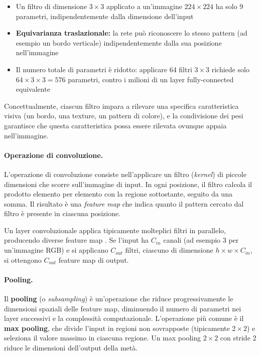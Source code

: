 \begin{itemize}
\item Un filtro di dimensione $3 \times 3$ applicato a un'immagine $224 \times 224$ ha solo 9 parametri, indipendentemente dalla dimensione dell'input
\item \textbf{Equivarianza traslazionale:} la rete può riconoscere lo stesso pattern (ad esempio un bordo verticale) indipendentemente dalla sua posizione nell'immagine 
\item Il numero totale di parametri è ridotto: applicare 64 filtri $3 \times 3$ richiede solo $64 \times 3 \times 3 = 576$ parametri, contro i milioni di un layer fully-connected equivalente
\end{itemize}

Concettualmente, ciascun filtro impara a rilevare una specifica caratteristica visiva (un bordo, una texture, un pattern di colore), e la condivisione dei pesi garantisce che questa caratteristica possa essere rilevata ovunque appaia nell'immagine.

\paragraph{Operazione di convoluzione.} L'operazione di convoluzione consiste nell'ap\-pli\-ca\-re un filtro (\textit{kernel}) di piccole dimensioni che scorre sull'immagine di input. In ogni posizione, il filtro calcola il prodotto elemento per elemento con la regione sottostante, seguito da una somma. Il risultato è una \textit{feature map} che indica quanto il pattern cercato dal filtro è presente in ciascuna posizione.

Un layer convoluzionale applica tipicamente molteplici filtri in parallelo, producendo diverse feature map \cite{lecun2015deep}. Se l'input ha $C_{in}$ canali (ad esempio 3 per un'immagine RGB) e si applicano $C_{out}$ filtri, ciascuno di dimensione $h \times w \times C_{in}$, si ottengono $C_{out}$ feature map di output.

\paragraph{Pooling.} Il \textbf{pooling} (o \textit{subsampling}) è un'operazione che riduce progressivamente le dimensioni spaziali delle feature map, diminuendo il numero di parametri nei layer successivi e la complessità computazionale. L'operazione più comune è il \textbf{max pooling}, che divide l'input in regioni non sovrapposte (tipicamente $2 \times 2$) e seleziona il valore massimo in ciascuna regione. Un max pooling $2 \times 2$ con stride 2 riduce le dimensioni dell'output della metà.

